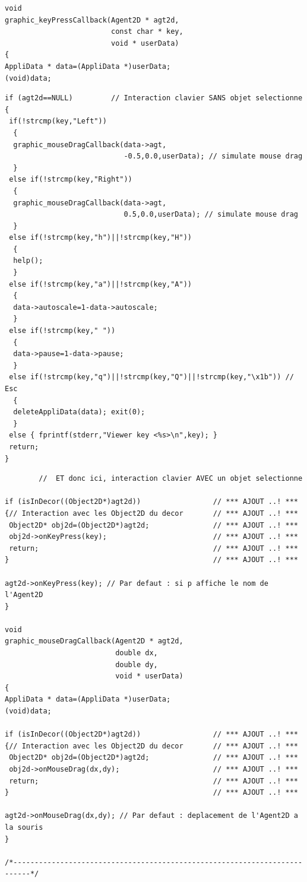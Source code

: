 \documentclass[12pt]{article}
\begin{document}
\begin{small}
\begin{verbatim}
void
graphic_keyPressCallback(Agent2D * agt2d,
                         const char * key,
                         void * userData)
{
AppliData * data=(AppliData *)userData;
(void)data;
\end{verbatim}
\begin{verbatim}
if (agt2d==NULL)         // Interaction clavier SANS objet selectionne
{
 if(!strcmp(key,"Left"))
  {
  graphic_mouseDragCallback(data->agt,
                            -0.5,0.0,userData); // simulate mouse drag
  }
 else if(!strcmp(key,"Right"))
  {
  graphic_mouseDragCallback(data->agt,
                            0.5,0.0,userData); // simulate mouse drag
  }
 else if(!strcmp(key,"h")||!strcmp(key,"H"))
  {
  help();
  }
 else if(!strcmp(key,"a")||!strcmp(key,"A"))
  {
  data->autoscale=1-data->autoscale;
  }
 else if(!strcmp(key," "))
  {
  data->pause=1-data->pause;
  }
 else if(!strcmp(key,"q")||!strcmp(key,"Q")||!strcmp(key,"\x1b")) // Esc
  {
  deleteAppliData(data); exit(0);
  }
 else { fprintf(stderr,"Viewer key <%s>\n",key); }
 return;
}
\end{verbatim}
\newpage
\begin{verbatim}
        //  ET donc ici, interaction clavier AVEC un objet selectionne

if (isInDecor((Object2D*)agt2d))                 // *** AJOUT ..! ***
{// Interaction avec les Object2D du decor       // *** AJOUT ..! ***
 Object2D* obj2d=(Object2D*)agt2d;               // *** AJOUT ..! ***
 obj2d->onKeyPress(key);                         // *** AJOUT ..! ***
 return;                                         // *** AJOUT ..! ***
}                                                // *** AJOUT ..! ***

agt2d->onKeyPress(key); // Par defaut : si p affiche le nom de l'Agent2D
}

void
graphic_mouseDragCallback(Agent2D * agt2d,
                          double dx,
                          double dy,
                          void * userData)
{
AppliData * data=(AppliData *)userData;
(void)data;

if (isInDecor((Object2D*)agt2d))                 // *** AJOUT ..! ***
{// Interaction avec les Object2D du decor       // *** AJOUT ..! ***
 Object2D* obj2d=(Object2D*)agt2d;               // *** AJOUT ..! ***
 obj2d->onMouseDrag(dx,dy);                      // *** AJOUT ..! ***
 return;                                         // *** AJOUT ..! ***
}                                                // *** AJOUT ..! ***

agt2d->onMouseDrag(dx,dy); // Par defaut : deplacement de l'Agent2D a la souris
}

/*--------------------------------------------------------------------------*/
\end{verbatim}
\end{small}
\end{document}
